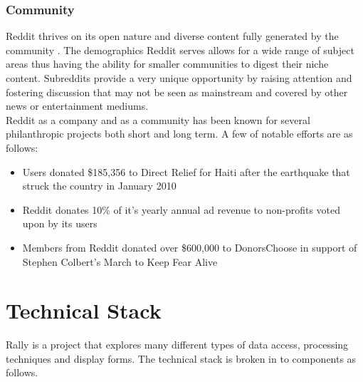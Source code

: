 \documentclass[msc,oneside]{ubcthesis}%
\begin{document}
\subsection{Community}
Reddit thrives on its open nature and diverse content fully generated by the community \citep{Atlantic}. The demographics Reddit serves allows for a wide range of subject areas thus having the ability for smaller communities to digest their niche content. Subreddits provide a very unique opportunity by raising attention and fostering discussion that may not be seen as mainstream and covered by other news or entertainment mediums.\\
Reddit as a company and as a community has been known for several philanthropic projects both short and long term. A few of notable efforts are as follows:
\begin{itemize}
\item{Users donated \$185,356 to Direct Relief for Haiti after the earthquake that struck the country in January 2010}
\item{Reddit donates 10\% of it's yearly annual ad revenue to non-profits voted upon by its users \citep{RedditBlog}}
\item{Members from Reddit donated over \$600,000 to DonorsChoose in support of Stephen Colbert's March to Keep Fear Alive \citep{DonorsChoose}}
\end{itemize}

\chapter{Technical Stack}
Rally is a project that explores many different types of data access, processing techniques and display forms. The technical stack is broken in to components as follows.





\newpage %
\pagestyle{fancy}\rhead{}\cfoot{}\rfoot{\thepage}

%
\end{document}
